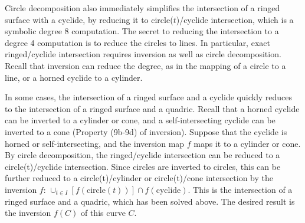 
Circle decomposition also immediately simplifies the intersection
of a ringed surface with a cyclide,
by reducing it to circle($t$)/cyclide intersection, 
which is a symbolic degree 8 computation.
The secret to reducing the intersection to a degree 4 computation 
is to reduce the circles to lines.
In particular, exact ringed/cyclide intersection
requires inversion as well as circle decomposition.
%
%
Recall that inversion can reduce the degree, as in the mapping
of a circle to a line, or a horned cyclide to a cylinder.

In some cases, the intersection of a ringed surface and a cyclide quickly 
reduces to the intersection of a ringed surface and a quadric.
Recall that a horned cyclide can be inverted to a cylinder or cone,
and a self-intersecting cyclide can be inverted to a cone
(Property (9b-9d) of inversion).
Suppose that the cyclide is horned or self-intersecting,
and the inversion map $f$ maps it to a cylinder or cone.
By circle decomposition, the ringed/cyclide intersection can be reduced to
a circle(t)/cyclide intersection.
Since circles are inverted to circles, this can 
be further reduced to a circle(t)/cylinder or circle(t)/cone intersection
by the inversion $f$:
$\cup_{t \in I} [f(\mbox{circle}(t))] \cap f(\mbox{cyclide})$.
This is the intersection of a ringed surface and a quadric,
which has been solved above.
The desired result is the inversion $f(C)$ of this curve $C$.


